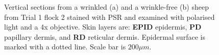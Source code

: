 %

\begin{figure}[!h]
\centering
\captionsetup{width=0.92\textwidth}
  \caption{Vertical sections from a wrinkled (a) and a wrinkle-free (b) sheep from Trial 1 flock 2 stained with PSR and examined with polarised light and a 4x objective. Skin layers are: {\bf EPID} epidermis, {\bf PD} papillary dermis, and {\bf RD} reticular dermis. Epidermal surface is marked with a dotted line. Scale bar is $200\mu m$. }
\vfill
  \label{fig:polar}
\end{figure}

%


